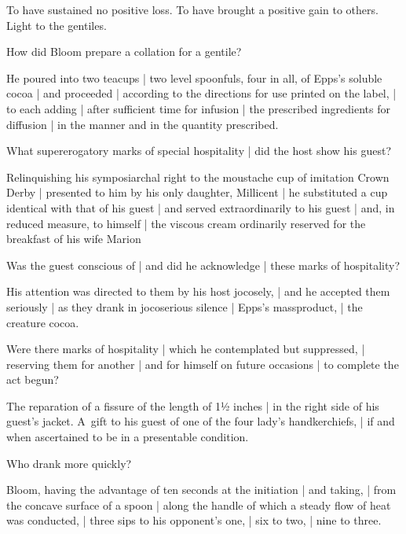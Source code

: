 \Bloom
To have sustained no positive loss.
To have brought a positive gain to others.
Light to the gentiles.



How did Bloom prepare a collation for a gentile?

\Science
He poured into two teacups |
two level spoonfuls, four in all, of Epps's soluble cocoa |
and proceeded |
according to the directions for use printed on the label, |
to each adding |
after sufficient time for infusion |
the prescribed ingredients for diffusion |
in the manner and in the quantity prescribed.


What supererogatory marks of special hospitality |
did the host show his guest?%

\Factual
Relinquishing his symposiarchal right
to the moustache cup of imitation Crown Derby |
presented to him by his only daughter,
Millicent
 |
he substituted a cup identical with that of his guest |
and served extraordinarily to his guest |
and, in reduced measure, to himself |
the viscous cream ordinarily reserved
for the breakfast of his wife Marion



Was the guest conscious of |
and did he acknowledge |
these marks of hospitality?

\Factual
His attention was directed to them by his host jocosely, |
and he accepted them seriously |
as they drank in jocoserious silence |
Epps's massproduct, |
the creature cocoa.%


Were there marks of hospitality |
which he contemplated but suppressed, |
reserving them for another |
and for himself on future occasions |
to complete the act begun?

\Bloom
The reparation of a fissure of the length of 1½ inches |
in the right side of his guest's jacket.
A~gift to his guest of one of the four lady's handkerchiefs, |
if and when ascertained to be in a presentable condition.



Who drank more quickly?

\Science {}
Bloom,
having the advantage of ten seconds at the initiation |
and taking, |
from the concave surface of a spoon |
along the handle of which a steady flow of heat was conducted, |
three sips to his opponent's one, |
six to two, |
nine to three.


